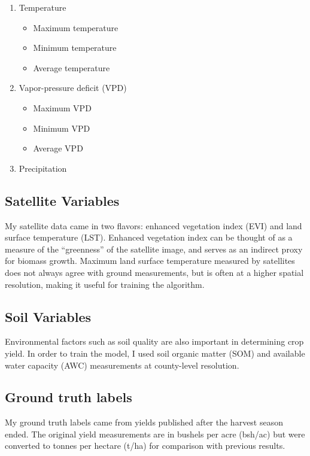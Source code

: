 \documentclass[letterpaper]{article}
\begin{document}
\begin{enumerate}
    \item Temperature
    \begin{itemize}
        \item Maximum temperature
        \item Minimum temperature
        \item Average temperature
    \end{itemize}
    \item Vapor-pressure deficit (VPD)
    \begin{itemize}
        \item Maximum VPD
        \item Minimum VPD
        \item Average VPD
    \end{itemize}
    \item Precipitation
\end{enumerate}

\subsection{Satellite Variables}

My satellite data came in two flavors: enhanced vegetation index (EVI) and land surface temperature (LST). Enhanced vegetation index can be thought of as a measure of the ``greenness'' of the satellite image, and serves as an indirect proxy for biomass growth. Maximum land surface temperature measured by satellites does not always agree with ground measurements, but is often at a higher spatial resolution, making it useful for training the algorithm.

\subsection{Soil Variables}

Environmental factors such as soil quality are also important in determining crop yield. In order to train the model, I used soil organic matter (SOM) and available water capacity (AWC) measurements at county-level resolution.

\subsection{Ground truth labels}

My ground truth labels came from yields published after the harvest season ended. The original yield measurements are in bushels per acre (bsh/ac) but were converted to tonnes per hectare (t/ha) for comparison with previous results.
\end{document}
